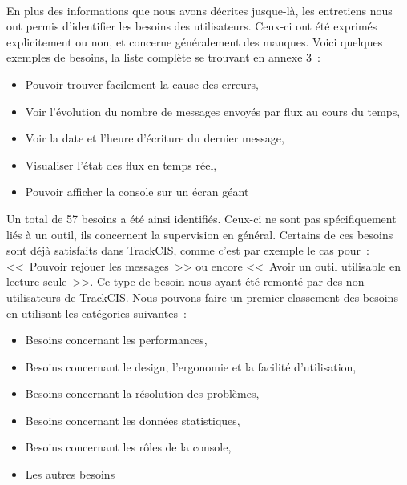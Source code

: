 			\paragraph{}%
			En plus des informations que nous avons décrites jusque-là, les entretiens
			nous ont permis d'identifier les besoins des utilisateurs. Ceux-ci ont été
			exprimés explicitement ou non, et concerne généralement des manques. Voici
			quelques exemples de besoins, la liste complète se trouvant en annexe 3~:
			\begin{itemize}
			  \item Pouvoir trouver facilement la cause des erreurs,
			  \item Voir l'évolution du nombre de messages envoyés par flux au cours du
			  temps,
			  \item Voir la date et l'heure d'écriture du dernier message,
			  \item Visualiser l'état des flux en temps réel,
			  \item Pouvoir afficher la console sur un écran géant
			\end{itemize}
			Un total de 57 besoins a été ainsi identifiés. Ceux-ci ne sont pas
			spécifiquement liés à un outil, ils concernent la supervision
			en général. Certains de ces besoins sont déjà satisfaits dans
			TrackCIS, comme c'est par exemple le cas pour~: <<~Pouvoir rejouer les
			messages~>> ou encore <<~Avoir un outil utilisable en lecture seule~>>. Ce
			type de besoin nous ayant été remonté par des non utilisateurs de TrackCIS. Nous
			pouvons faire un premier classement des besoins en utilisant les catégories
			suivantes~:
			\begin{itemize}
			  \item Besoins concernant les performances,
			  \item Besoins concernant le design, l'ergonomie et la facilité
			  d'utilisation,
			  \item Besoins concernant la résolution des problèmes,
			  \item Besoins concernant les données statistiques,
			  \item Besoins concernant les rôles de la console,
			  \item Les autres besoins
			\end{itemize}
			
